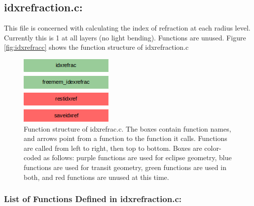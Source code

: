 \documentclass[letterpaper,12pt]{article}
\begin{document}
\newpage
\subsection{idxrefraction.c:}
This file is concerned with calculating the index of refraction at each radius level. Currently this is 1 at all layers (no light bending). Functions  are unused. Figure \ref{fig:idxrefracc} shows the function structure of idxrefraction.c

\begin{figure}
\includegraphics{fig/idxrefractionc}
\caption{Function structure of idxrefrac.c. The boxes contain function names, and arrows point from a function to the function it calls. Functions are called from left to right, then top to bottom.  Boxes are color-coded as follows:  purple functions are used for eclipse geometry, blue functions are used for transit geometry, green functions are used in both, and red functions are unused at this time.}
\label{fig:idxrefractionc}
\end{figure}

\subsubsection{List of Functions Defined in idxrefraction.c:}
 \newline

 \newline

 \newline

 \newline
\end{document}
